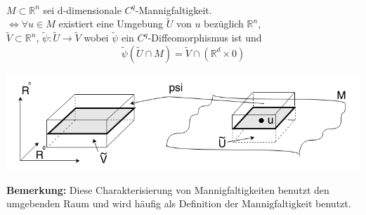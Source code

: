 \begin{satz}
\mbox{} \\
$M \subset \mathbb{R}^n $ sei d-dimensionale $C^q$-Mannigfaltigkeit. \\
$\Longleftrightarrow \forall u \in M $ existiert eine Umgebung $\tilde{U}$ von $u$ 
bezüglich $\mathbb{R}^n$, \\
$\tilde{V} \subset \mathbb{R}^n $, 
$\tilde{\psi}: \tilde{U} \rightarrow \tilde{V} $ wobei $\tilde{\psi} $ 
ein $C^q$-Diffeomorphismus ist und 
    \begin{equation*}
    \tilde{\psi} \left( \tilde{U} \cap M \right) =
    \tilde{V} \cap \left( \mathbb{R}^d \times {0} \right) 
    \end{equation*}
\begin{center}
\includegraphics[scale=0.5]{pictures/MA2_0011}\\
\end{center}
\end{satz}

\textbf{Bemerkung:} Diese Charakterisierung von Mannigfaltigkeiten benutzt den umgebenden Raum und wird häufig als Definition der Mannigfaltigkeit benutzt.    
    
